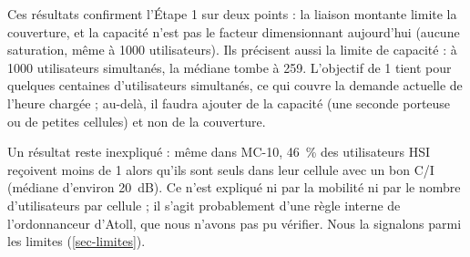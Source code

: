 Ces résultats confirment l'Étape 1 sur deux points : la liaison montante limite la couverture, et la capacité n'est pas le facteur dimensionnant aujourd'hui (aucune saturation, même à \num{1000} utilisateurs). Ils précisent aussi la limite de capacité : à \num{1000} utilisateurs simultanés, la médiane tombe à \SI{259}{\kbps}. L'objectif de \SI{1}{\Mbps} tient pour quelques centaines d'utilisateurs simultanés, ce qui couvre la demande actuelle de l'heure chargée ; au-delà, il faudra ajouter de la capacité (une seconde porteuse ou de petites cellules) et non de la couverture.

Un résultat reste inexpliqué : même dans MC-10, \SI{46}{\percent} des utilisateurs HSI reçoivent moins de \SI{1}{\Mbps} alors qu'ils sont seuls dans leur cellule avec un bon C/I (médiane d'environ \SI{20}{\deci\bel}). Ce n'est expliqué ni par la mobilité ni par le nombre d'utilisateurs par cellule ; il s'agit probablement d'une règle interne de l'ordonnanceur d'Atoll, que nous n'avons pas pu vérifier. Nous la signalons parmi les limites (\cref{sec-limites}).

